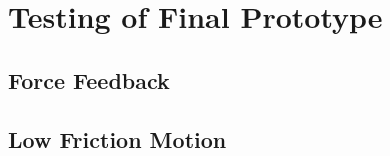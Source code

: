 \section{Testing of Final Prototype}
\label{sec:testing_of_final_prototype}

\subsection{Force Feedback}
\label{sub:force_feedback}


\subsection{Low Friction Motion}
\label{sub:low_friction_motion}

